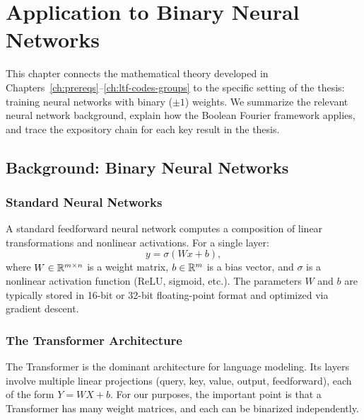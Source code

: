 
\chapter{Application to Binary Neural Networks}\label{ch:applications}

This chapter connects the mathematical theory developed in
Chapters~\ref{ch:prereqs}--\ref{ch:ltf-codes-groups} to the specific
setting of the thesis: training neural networks with binary ($\pm 1$)
weights. We summarize the relevant neural network background, explain
how the Boolean Fourier framework applies, and trace the expository
chain for each key result in the thesis.

\section{Background: Binary Neural Networks}\label{sec:bnn-background}

\subsection{Standard Neural Networks}\label{sec:standard-nn}

A standard feedforward neural network computes a composition of linear
transformations and nonlinear activations. For a single layer:
\[
  y = \sigma(Wx + b),
\]
where $W \in \mathbb{R}^{m \times n}$ is a weight matrix, $b \in \mathbb{R}^m$ is a
bias vector, and $\sigma$ is a nonlinear activation function (ReLU,
sigmoid, etc.). The parameters $W$ and $b$ are typically stored in
16-bit or 32-bit floating-point format and optimized via gradient descent.

\subsection{The Transformer Architecture}\label{sec:transformer}

The Transformer \citep{vaswani2017attention} is the dominant architecture
for language modeling. Its layers involve multiple linear projections
(query, key, value, output, feedforward), each of the form $Y = WX + b$.
For our purposes, the important point is that a Transformer has many
weight matrices, and each can be binarized independently.

